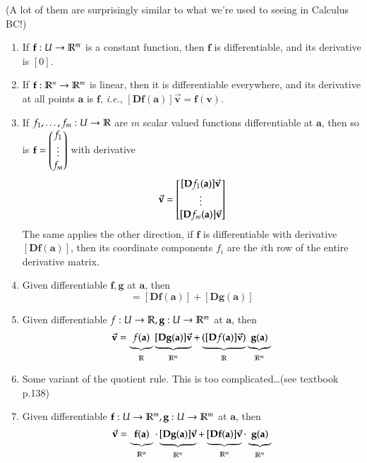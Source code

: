 (A lot of them are surprisingly similar to what we're used to seeing in Calculus BC!)
\begin{enumerate}[1.]
  \item If $\textbf{f} : U \to \mathbb{R}^m$ is a constant function, then $\bm{f}$ is differentiable, and its derivative is $[0]$.
  \item If $\textbf{f} : \mathbb{R}^n \to \mathbb{R}^m$ is linear, then it is differentiable everywhere, and its derivative at all points $\bm{a}$ is $\bm{f}$, \textit{i.e.}, $[\bm{Df}(\bm{a})]\vec{\bm{v}}=\bm{f}(\bm{v})$. 
  \item If $f_1, \dots, f_m : U \to \mathbb{R}$ are $m$ scalar valued functions differentiable at $\bm{a}$, then so is $\textbf{f}=\begin{pmatrix} f_1 \\ \vdots \\ f_m \end{pmatrix}$ with derivative
\begin{equation}
	  [\bm{Df}(\bm{a})]\vec{\bm{v}}=\mtrx{[\bm{D}f_1(\bm{a})]\vec{\bm{v}} \\ \vdots \\ [\bm{D}f_m(\bm{a})]\vec{\bm{v}}}
\end{equation}
  The same applies the other direction, if $\bm{f}$ is differentiable with derivative $[\bm{Df}(\bm{a})]$, then its coordinate components $f_i$ are the $i$th row of the entire derivative matrix. 
  \item Given differentiable $\bm{f}, \bm{g}$ at $\bm{a}$, then
  \begin{equation}
  	[\bm{D}(\bm{f}+\bm{g})(\bm{a})] = [\bm{D}\bm{f}(\bm{a})]+[\bm{D}\bm{g}(\bm{a})]
  \end{equation}
  \item Given differentiable $f : U\to \mathbb{R}, \textbf{g} : U\to \mathbb{R}^m$ at $\bm{a}$, then 
  \begin{equation}
  	[\bm{D}(f\bm{g})(\bm{a})]\vec{\bm{v}} = \underbrace{f(\bm{a})}_{\R} \underbrace{[\bm{D}\bm{g}(\bm{a})]\vec{\bm{v}}}_{\R^m}+\underbrace{([\bm{D}f(\bm{a})]\vec{\bm{v}})}_{\R}\underbrace{\bm{g}(\bm{a})}_{\R^m}
  \end{equation}
  \item Some variant of the quotient rule. This is too complicated\dots (see textbook p.138)
  \item Given differentiable $\textbf{f} : U\to \mathbb{R}^m, \textbf{g} : U\to \mathbb{R}^m$ at $\bm{a}$, then 
  \begin{equation}
  	[\bm{D}(\bm{f}\cdot\bm{g})(\bm{a})]\vec{\bm{v}} = \underbrace{\bm{f}(\bm{a})}_{\R^m} \cdot \underbrace{[\bm{D}\bm{g}(\bm{a})]\vec{\bm{v}}}_{\R^m}+\underbrace{[\bm{D}\bm{f}(\bm{a})]\vec{\bm{v}}}_{\R^m}\cdot \underbrace{\bm{g}(\bm{a})}_{\R^m}
  \end{equation}

\end{enumerate}

